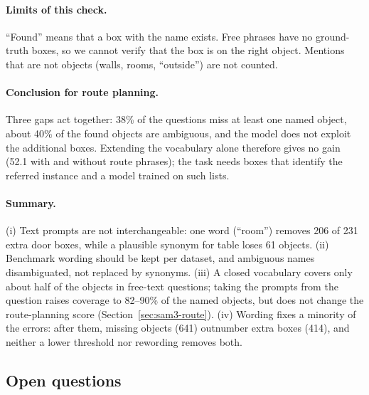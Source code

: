 \paragraph{Limits of this check.}
``Found'' means that a box with the name exists. Free phrases have no ground-truth boxes, so we cannot verify
that the box is on the right object. Mentions that are not objects (walls, rooms, ``outside'') are not counted.

\paragraph{Conclusion for route planning.}
Three gaps act together: 38\% of the questions miss at least one named object, about 40\% of the found objects
are ambiguous, and the model does not exploit the additional boxes. Extending the vocabulary alone therefore
gives no gain (52.1 with and without route phrases); the task needs boxes that identify the referred instance
and a model trained on such lists.

\paragraph{Summary.}
(i) Text prompts are not interchangeable: one word (``room'') removes 206 of 231 extra door boxes, while a
plausible synonym for table loses 61 objects.
(ii) Benchmark wording should be kept per dataset, and ambiguous names disambiguated, not replaced by synonyms.
(iii) A closed vocabulary covers only about half of the objects in free-text questions; taking the prompts from
the question raises coverage to 82--90\% of the named objects, but does not change the route-planning score
(Section~\ref{sec:sam3-route}).
(iv) Wording fixes a minority of the errors: after them, missing objects (641) outnumber extra boxes (414), and
neither a lower threshold nor rewording removes both.

\subsection{Open questions}
\label{sec:sam3-open}

